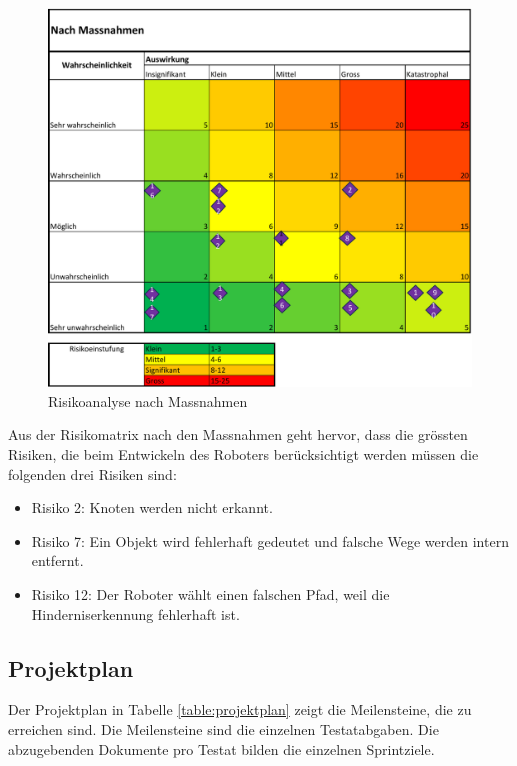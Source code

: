 \begin{figure}[H]
\centering
\includegraphics[width=\textwidth -30mm]{assets/Risikoanalyse-nachher.pdf}
\caption{Risikoanalyse nach Massnahmen}
\label{fig:risk-after}
\end{figure}

Aus der Risikomatrix nach den Massnahmen geht hervor, dass die grössten Risiken, die beim Entwickeln des Roboters berücksichtigt werden müssen die folgenden drei Risiken sind:

\begin{itemize}
    \item Risiko 2: Knoten werden nicht erkannt.
    \item Risiko 7: Ein Objekt wird fehlerhaft gedeutet und falsche Wege werden intern entfernt.
    \item Risiko 12: Der Roboter wählt einen falschen Pfad, weil die Hinderniserkennung fehlerhaft ist.
\end{itemize}


\newpage
\subsection{Projektplan}

Der Projektplan in Tabelle \ref{table:projektplan} zeigt die Meilensteine, die zu erreichen sind.
Die Meilensteine sind die einzelnen Testatabgaben.
Die abzugebenden Dokumente pro Testat bilden die einzelnen Sprintziele.

